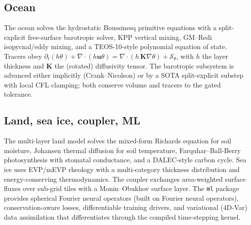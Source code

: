 \documentclass[11pt]{article}
\newcommand{\pp}{\partial}
\newcommand{\vect}[1]{\bm{#1}}
\newcommand{\grad}{\nabla}
\newcommand{\divg}{\nabla\!\cdot\!}
\begin{document}
\subsection{Ocean}
The ocean solves the hydrostatic Boussinesq primitive equations with a split-explicit
free-surface barotropic solver\cite{ShchepetkinMcWilliams2005}, KPP vertical
mixing\cite{LMD1994}, GM--Redi isopycnal/eddy mixing\cite{GM1990}, and a TEOS-10-style
polynomial equation of state. Tracers obey
$\pp_t(h\theta)+\divg(h\vect{u}\theta)=\divg(h\,\mathbf{K}\grad\theta)+\mathcal{S}_\theta$,
with $h$ the layer thickness and $\mathbf{K}$ the (rotated) diffusivity tensor. The barotropic
subsystem is advanced either implicitly (Crank--Nicolson) or by a SOTA split-explicit substep
with local CFL clamping; both conserve volume and tracers to the gated tolerance.

\subsection{Land, sea ice, coupler, ML}
The multi-layer land model solves the mixed-form Richards
equation\cite{VanGenuchten1980} for soil moisture, Johansen thermal diffusion for soil
temperature, Farquhar--Ball-Berry photosynthesis\cite{Farquhar1980} with stomatal conductance,
and a DALEC-style carbon cycle. Sea ice uses EVP/mEVP
rheology\cite{HunkeDukowicz1997} with a multi-category thickness distribution and
energy-conserving thermodynamics. The coupler exchanges area-weighted surface fluxes over
sub-grid tiles with a Monin--Obukhov surface layer. The \texttt{ml} package provides spherical
Fourier neural operators\cite{Bonev2023} (built on Fourier neural operators\cite{Li2021}),
conservation-aware losses, differentiable training drivers, and variational (4D-Var) data
assimilation that differentiates through the compiled time-stepping kernel.

\end{document}
